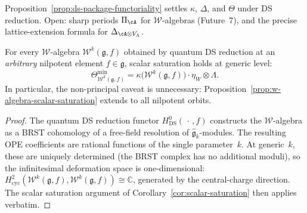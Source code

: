 \begin{remark}
\label{rem:ds-functoriality-open}
Proposition~\ref{prop:ds-package-functoriality} settles $\kappa$,
$\Delta$, and $\Theta$ under DS reduction.  Open: sharp periods
$\Pi_{\cA}$ for $\mathcal{W}$-algebras (Future~7), and the
precise lattice-extension formula for
$\Delta_{\cA\otimes V_\Lambda}$.
\end{remark}

\begin{proposition}
\label{prop:nonprincipal-scalar-saturation}
For every $\mathcal{W}$-algebra $\mathcal{W}^k(\mathfrak{g}, f)$
obtained by quantum DS reduction at an \emph{arbitrary} nilpotent
element $f \in \mathfrak{g}$, scalar saturation holds at generic
level:
\[
\Theta_{\mathcal{W}^k(\mathfrak{g}, f)}^{\min}
= \kappa\bigl(\mathcal{W}^k(\mathfrak{g}, f)\bigr)
\cdot \eta_W \otimes \Lambda.
\]
In particular, the non-principal caveat is unnecessary:
Proposition~\textup{\ref{prop:w-algebra-scalar-saturation}}
extends to all nilpotent orbits.
\end{proposition}

\begin{proof}
The quantum DS reduction functor
$H^0_{\mathrm{DS}}(\,\cdot\,, f)$ constructs the
$\mathcal{W}$-algebra as a BRST cohomology of a free-field
resolution of $\widehat{\mathfrak{g}}_k$-modules.  The resulting
OPE coefficients are rational functions of the single
parameter~$k$.  At generic~$k$, these are uniquely determined
(the BRST complex has no additional moduli), so the infinitesimal
deformation space is one-dimensional:
$H^2_{\mathrm{cyc}}(\mathcal{W}^k(\mathfrak{g},f),
\mathcal{W}^k(\mathfrak{g},f)) \cong \mathbb{C}$,
generated by the central-charge direction.
The scalar saturation argument of
Corollary~\ref{cor:scalar-saturation} then applies verbatim.
\end{proof}

